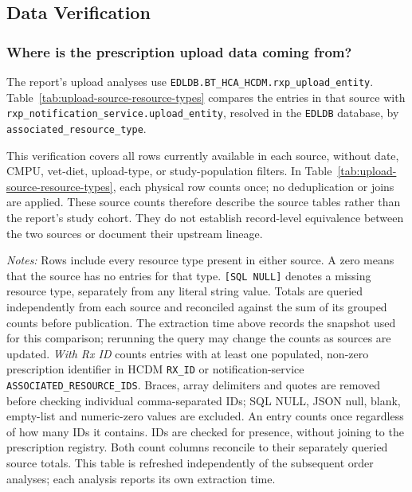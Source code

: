 \clearpage
\subsection{Data Verification}\label{app:data-verification}
\subsubsection{Where is the prescription upload data coming from?}
\label{subsec:upload-data-sources}
The report's upload analyses use
\texttt{EDLDB.BT\_HCA\_HCDM.rxp\_upload\_entity}.
Table~\ref{tab:upload-source-resource-types} compares the entries in that
source with \texttt{rxp\_notification\_service.upload\_entity}, resolved in
the \texttt{EDLDB} database, by \texttt{associated\_resource\_type}.

This verification covers all rows currently available in each source,
without date, CMPU, vet-diet, upload-type, or study-population filters.
In Table~\ref{tab:upload-source-resource-types}, each physical row counts
once; no deduplication or joins are applied.
These source counts therefore describe the source tables rather than the report's
study cohort. They do not establish record-level equivalence between the
two sources or document their upstream lineage.



\noindent\textit{Notes:} Rows include every resource type present in either
source. A zero means that the source has no entries for that type.
\texttt{[SQL NULL]} denotes a missing resource type, separately from any
literal string value. Totals are queried independently from each source
and reconciled against the sum of its grouped counts before publication.
The extraction time above records the snapshot used for this comparison;
rerunning the query may change the counts as sources are updated.
\textit{With Rx ID} counts entries with at least one populated, non-zero
prescription identifier in HCDM \texttt{RX\_ID} or notification-service
\texttt{ASSOCIATED\_RESOURCE\_IDS}. Braces, array delimiters and quotes are
removed before checking individual comma-separated IDs; SQL NULL, JSON null,
blank, empty-list and numeric-zero values are excluded. An entry counts once
regardless of how many IDs it contains. IDs are checked for presence, without
joining to the prescription registry. Both count columns reconcile to their
separately queried source totals.
This table is refreshed independently of the subsequent order analyses;
each analysis reports its own extraction time.



